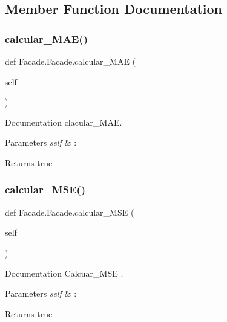 \subsection{Member Function Documentation}
\mbox{\label{class_facade_1_1_facade_abb62f6ed9e166bc1041ad7a3c57c4d58}} 
\subsubsection{\texorpdfstring{calcular\+\_\+\+M\+A\+E()}{calcular\_MAE()}}
{\footnotesize\ttfamily def Facade.\+Facade.\+calcular\+\_\+\+M\+AE (\begin{DoxyParamCaption}\item[{}]{self }\end{DoxyParamCaption})}



Documentation clacular\+\_\+\+M\+AE. 


\begin{DoxyParams}{Parameters}
{\em self} & \+: \\
\hline
\end{DoxyParams}
\begin{DoxyReturn}{Returns}
true 
\end{DoxyReturn}
\mbox{\label{class_facade_1_1_facade_a37747590f3e1ade1250e56dd9c424d03}} 
\subsubsection{\texorpdfstring{calcular\+\_\+\+M\+S\+E()}{calcular\_MSE()}}
{\footnotesize\ttfamily def Facade.\+Facade.\+calcular\+\_\+\+M\+SE (\begin{DoxyParamCaption}\item[{}]{self }\end{DoxyParamCaption})}



Documentation Calcuar\+\_\+\+M\+SE . 


\begin{DoxyParams}{Parameters}
{\em self} & \+: \\
\hline
\end{DoxyParams}
\begin{DoxyReturn}{Returns}
true 
\end{DoxyReturn}
\mbox{\label{class_facade_1_1_facade_ad01d3a1108a539ada2d0615c53b160de}} 
